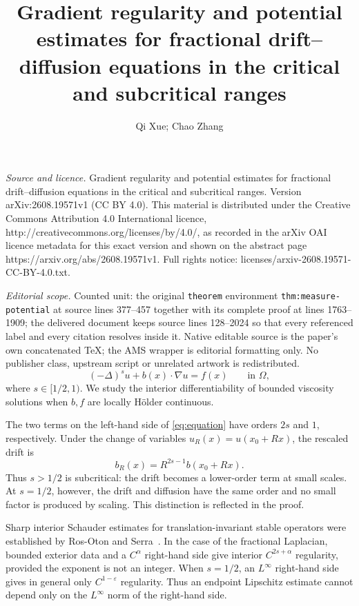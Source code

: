 \documentclass[10pt,a4paper]{amsart}
\numberwithin{equation}{section}
\begin{document}
\title[Gradient regularity and potential estimates for fractional d]{Gradient regularity and potential estimates for fractional drift--diffusion equations in the critical and subcritical ranges}
\author{Qi Xue; Chao Zhang}
\date{}
\maketitle
\noindent\emph{Source and licence.} Gradient regularity and potential estimates for fractional drift--diffusion equations in the critical and subcritical ranges. Version arXiv:2608.19571v1 (CC BY 4.0). This material is distributed under the Creative Commons Attribution 4.0 International licence, http://creativecommons.org/licenses/by/4.0/, as recorded in the arXiv OAI licence metadata for this exact version and shown on the abstract page https://arxiv.org/abs/2608.19571v1. Full rights notice: licenses/arxiv-2608.19571-CC-BY-4.0.txt.\par\smallskip
\noindent\textit{Editorial scope.} Counted unit: the original \texttt{theorem} environment \texttt{thm:measure-potential} at source lines 377--457 together with its complete proof at lines 1763--1909; the delivered document keeps source lines 128--2024 so that every referenced label and every citation resolves inside it. Native editable source is the paper's own concatenated TeX; the AMS wrapper is editorial formatting only. No publisher class, upstream script or unrelated artwork is redistributed.
\begin{equation}\label{eq:equation}
 (-\Delta)^s u+b(x)\cdot\nabla u=f(x)
 \qquad\text{in }\Omega,
\end{equation}
where $s\in[1/2,1)$.  We study the interior differentiability of bounded
viscosity solutions when $b,f$ are locally H\"older continuous.

The two terms on the left-hand side of \eqref{eq:equation} have orders
$2s$ and $1$, respectively.  Under the change of variables
$u_R(x)=u(x_0+Rx)$, the rescaled drift is
\[
 b_R(x)=R^{2s-1}b(x_0+Rx).
\]
Thus $s>1/2$ is subcritical: the drift becomes a lower-order term at small
scales.
At $s=1/2$, however, the drift and diffusion have the same order and no
small factor is produced by scaling.  This distinction is reflected in the
proof.

Sharp interior Schauder estimates for translation-invariant stable operators
were established by Ros-Oton and Serra~\cite{RosOtonSerra2016}.  In the case
of the fractional Laplacian, bounded exterior data and a $C^\alpha$
right-hand side give interior $C^{2s+\alpha}$ regularity, provided the exponent
is not an integer.  When $s=1/2$, an $L^\infty$ right-hand side gives in
general only $C^{1-\varepsilon}$ regularity.  Thus an endpoint Lipschitz
estimate cannot depend only on the $L^\infty$ norm of the right-hand side.
\end{document}
